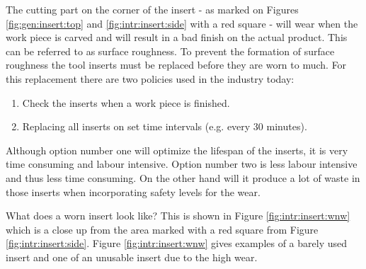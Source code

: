 The cutting part on the corner of the insert - as marked on Figures \ref{fig:gen:insert:top} and \ref{fig:intr:insert:side} with a red square - will wear when the work piece is carved and will result in a bad finish on the actual product. This can be referred to as surface roughness. To prevent the formation of surface roughness the tool inserts must be replaced before they are worn to much. For this replacement there are two policies used in the industry today:
    \begin{enumerate}
        \item Check the inserts when a work piece is finished.
        \item Replacing all inserts on set time intervals (e.g. every 30 minutes).
    \end{enumerate}
     Although option number one will optimize the lifespan of the inserts, it is very time consuming and labour intensive. Option number two is less labour intensive and thus less time consuming. On the other hand will it produce a lot of waste in those inserts when incorporating safety levels for the wear. 


What does a worn insert look like? This is shown in Figure \ref{fig:intr:insert:wnw} which is a close up from the area marked with a red square from Figure \ref{fig:intr:insert:side}.
Figure \ref{fig:intr:insert:wnw} gives examples of a barely used insert and one of an unusable insert due to the high wear.

